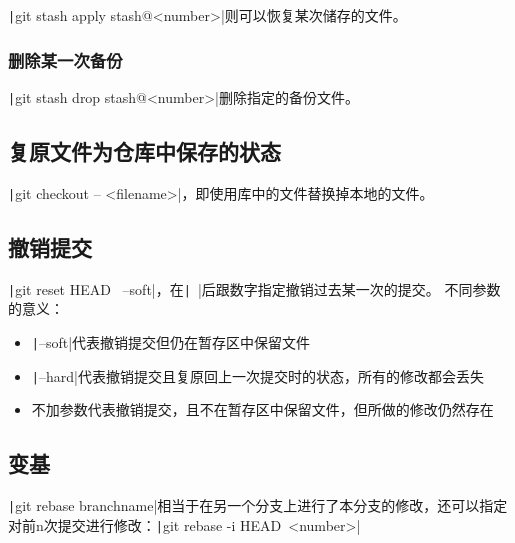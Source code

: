 \documentclass[fontset=ubuntu]{ctexart}
\begin{document}
\texttt|git stash apply stash@{<number>}|则可以恢复某次储存的文件。

\subsubsection{删除某一次备份}
\texttt|git stash drop stash@{<number>}|删除指定的备份文件。

\subsection{复原文件为仓库中保存的状态}
\texttt|git checkout -- <filename>|，即使用库中的文件替换掉本地的文件。

\subsection{撤销提交}
\texttt|git reset HEAD~ --soft|，在\texttt|~|后跟数字指定撤销过去某一次的提交。
不同参数的意义：
\begin{itemize}
    \item \texttt|--soft|代表撤销提交但仍在暂存区中保留文件
    \item \texttt|--hard|代表撤销提交且复原回上一次提交时的状态，所有的修改都会丢失
    \item 不加参数代表撤销提交，且不在暂存区中保留文件，但所做的修改仍然存在
\end{itemize}

\subsection{变基}
\texttt|git rebase {branchname}|相当于在另一个分支上进行了本分支的修改，还可以指定对前n次提交进行修改：\texttt|git rebase -i HEAD~{<number>}|
\end{document}
